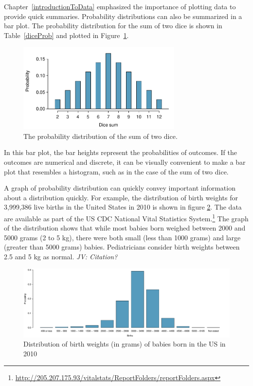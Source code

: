 Chapter~\ref{introductionToData} emphasized the importance of plotting data to provide quick summaries. Probability distributions can also be summarized in a bar plot. The probability distribution for the sum of two dice is shown in Table~\ref{diceProb} and plotted in Figure~\ref{diceSumDist}.

\begin{figure}
\centering
\includegraphics[width=0.73\textwidth]{ch_probability_oi_biostat/figures/diceSumDist/diceSumDist}
\caption{The probability distribution of the sum of two dice.}
\label{diceSumDist}
\end{figure}

In this bar plot, the bar heights represent the probabilities of outcomes. If the outcomes are numerical and discrete, it can be visually convenient to make a bar plot that resembles a histogram, such as in the case of the sum of two dice.  

A graph of probability distribution can quickly convey important information about a distribution quickly. For example, the distribution of birth weights for 3,999,386 live births in the United States in 2010 is shown in figure \ref{fig:birthwtMarginalDist}.  The data are available as part of the US CDC National Vital Statistics System.\footnote{\url{http://205.207.175.93/vitalstats/ReportFolders/reportFolders.aspx}} The graph of the distribution shows that while most babies born weighed between 2000 and 5000 grams (2 to 5 kg), there were both small (less than 1000 grams) and large (greater than 5000 grams) babies. Pediatricians consider birth weights between 2.5 and 5 kg as normal. \textit{JV: Citation?}

\begin{figure}[h]
	\includegraphics[width=\textwidth]{ch_probability_oi_biostat/figures/birthwtMarginalDist/birthwtMarginalDist.pdf}
	\caption{Distribution of birth weights (in grams) of babies born in the US in 2010}
	\label{fig:birthwtMarginalDist}
\end{figure}

